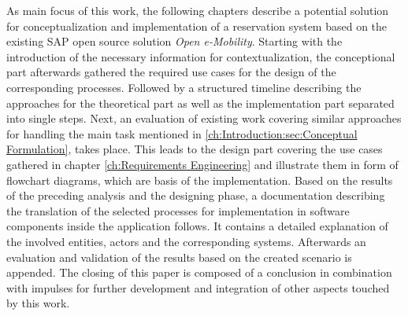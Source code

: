 As main focus of this work, the following chapters describe a potential solution for conceptualization and implementation of a reservation system based on the existing SAP open source solution \textit{Open e-Mobility}. 
Starting with the introduction of the necessary information for contextualization, the conceptional part afterwards gathered the required use cases for the design of the corresponding processes. 
Followed by a structured timeline describing the approaches for the theoretical part as well as the implementation part separated into single steps. 
Next, an evaluation of existing work covering similar approaches for handling the main task mentioned in \ref{ch:Introduction:sec:Conceptual Formulation}, takes place.
This leads to the design part covering the use cases gathered in chapter \ref{ch:Requirements Engineering} and illustrate them in form of flowchart diagrams, which are basis of the implementation. 
Based on the results of the preceding analysis and the designing phase, a documentation describing the translation of the selected processes for implementation in software components inside the application follows. It contains a detailed explanation of the involved entities, actors and the corresponding systems.
Afterwards an evaluation and validation of the results based on the created scenario is appended. 
The closing of this paper is composed of a conclusion in combination with impulses for further development and integration of other aspects touched by this work.